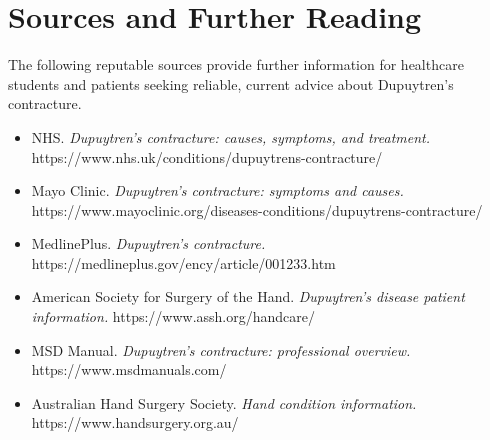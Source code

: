 \section*{Sources and Further Reading}
The following reputable sources provide further information for healthcare students and patients seeking reliable, current advice about Dupuytren's contracture.
\begin{itemize}
    \item NHS. \textit{Dupuytren's contracture: causes, symptoms, and treatment.} https://www.nhs.uk/conditions/dupuytrens-contracture/
    \item Mayo Clinic. \textit{Dupuytren's contracture: symptoms and causes.} https://www.mayoclinic.org/diseases-conditions/dupuytrens-contracture/
    \item MedlinePlus. \textit{Dupuytren's contracture.} https://medlineplus.gov/ency/article/001233.htm
    \item American Society for Surgery of the Hand. \textit{Dupuytren's disease patient information.} https://www.assh.org/handcare/
    \item MSD Manual. \textit{Dupuytren's contracture: professional overview.} https://www.msdmanuals.com/
    \item Australian Hand Surgery Society. \textit{Hand condition information.} https://www.handsurgery.org.au/
\end{itemize}
